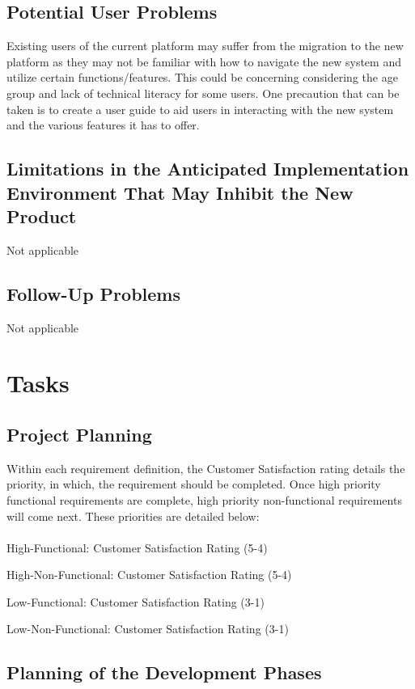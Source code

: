 \documentclass[12pt]{article}
\begin{document}
\subsection{Potential User Problems}

Existing users of the current platform may suffer from the migration
to the new platform as they may not be familiar with how to navigate
the new system and utilize certain functions/features. This could be
concerning considering the age group and lack of technical literacy
for some users. One precaution that can be taken is to create a user
guide to aid users in interacting with the new system and the various
features it has to offer.

\subsection{Limitations in the Anticipated Implementation Environment That May
Inhibit the New Product}
Not applicable
\subsection{Follow-Up Problems}
Not applicable

\section{Tasks}
\subsection{Project Planning}

Within each requirement definition, the Customer Satisfaction rating details the
priority, in which, the requirement should be completed. Once high priority
functional requirements are complete, high priority non-functional requirements
will come next. These priorities are detailed below: \\\\

High-Functional: Customer Satisfaction Rating (5-4)

High-Non-Functional: Customer Satisfaction Rating (5-4)

Low-Functional: Customer Satisfaction Rating (3-1)

Low-Non-Functional: Customer Satisfaction Rating (3-1)

\subsection{Planning of the Development Phases}
\end{document}
